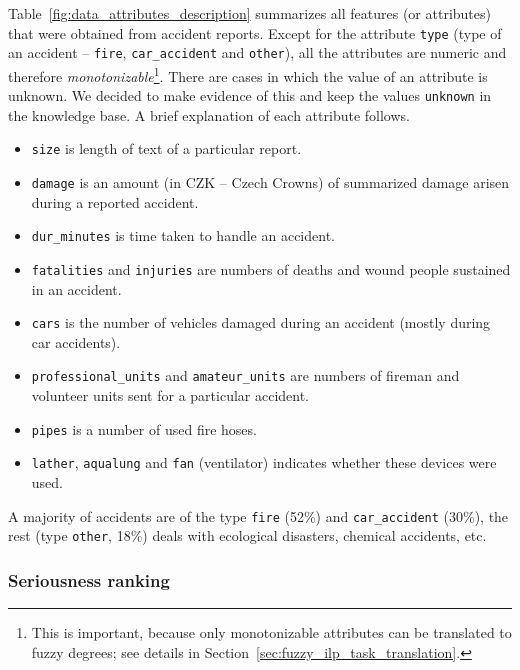 Table~\ref{fig:data_attributes_description} summarizes all features (or attributes) that were obtained from accident reports. Except for the attribute \verb+type+ (type of an accident -- \verb+fire+, \verb+car_accident+ and \verb+other+), all the attributes are numeric and therefore \emph{monotonizable}\footnote{This is important, because only monotonizable attributes can be translated to fuzzy degrees; see details in Section~\ref{sec:fuzzy_ilp_task_translation}.}. There are cases in which the value of an attribute is unknown. We decided to make evidence of this and keep the values \verb+unknown+ in the knowledge base. A brief explanation of each attribute follows.
\begin{itemize}
	\item \verb+size+ is length of text of a particular report.
	\item \verb+damage+ is an amount (in CZK -- Czech Crowns) of summarized damage arisen during a reported accident.
	\item \verb+dur_minutes+ is time taken to handle an accident.
	\item \verb+fatalities+ and \verb+injuries+ are numbers of deaths and wound people sustained in an accident.
	\item \verb+cars+ is the number of vehicles damaged during an accident (mostly during car accidents).
	\item \verb+professional_units+ and \verb+amateur_units+ are numbers of fireman and volunteer units sent for a particular accident.
	\item \verb+pipes+ is a number of used fire hoses.
	\item \verb+lather+, \verb+aqualung+ and \verb+fan+ (ventilator) indicates whether these devices were used.
\end{itemize}

A majority of accidents are of the type \verb+fire+ (52\%)
and \verb+car_accident+ (30\%),
the rest (type \verb+other+, 18\%)
deals with ecological disasters, chemical accidents, etc.

\subsubsection{Seriousness ranking} \label{sec:data_seriousness}



